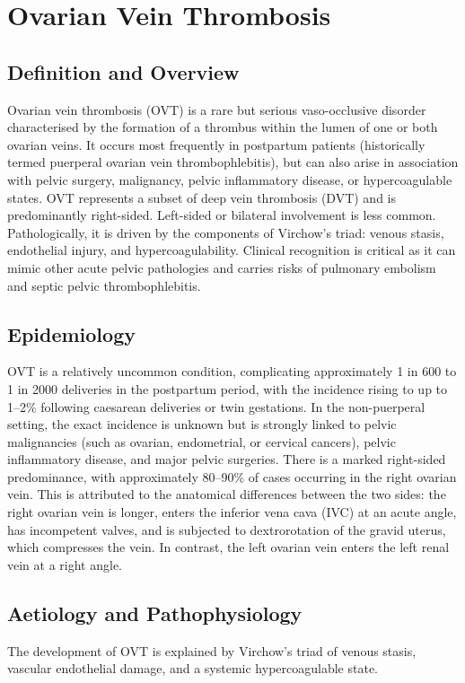 \chapter{Ovarian Vein Thrombosis}

\section*{Definition and Overview}
Ovarian vein thrombosis (OVT) is a rare but serious vaso-occlusive disorder characterised by the formation of a thrombus within the lumen of one or both ovarian veins. It occurs most frequently in postpartum patients (historically termed puerperal ovarian vein thrombophlebitis), but can also arise in association with pelvic surgery, malignancy, pelvic inflammatory disease, or hypercoagulable states. OVT represents a subset of deep vein thrombosis (DVT) and is predominantly right-sided. Left-sided or bilateral involvement is less common. Pathologically, it is driven by the components of Virchow's triad: venous stasis, endothelial injury, and hypercoagulability. Clinical recognition is critical as it can mimic other acute pelvic pathologies and carries risks of pulmonary embolism and septic pelvic thrombophlebitis.

\section*{Epidemiology}
OVT is a relatively uncommon condition, complicating approximately 1 in 600 to 1 in 2000 deliveries in the postpartum period, with the incidence rising to up to 1--2\% following caesarean deliveries or twin gestations. In the non-puerperal setting, the exact incidence is unknown but is strongly linked to pelvic malignancies (such as ovarian, endometrial, or cervical cancers), pelvic inflammatory disease, and major pelvic surgeries. There is a marked right-sided predominance, with approximately 80--90\% of cases occurring in the right ovarian vein. This is attributed to the anatomical differences between the two sides: the right ovarian vein is longer, enters the inferior vena cava (IVC) at an acute angle, has incompetent valves, and is subjected to dextrorotation of the gravid uterus, which compresses the vein. In contrast, the left ovarian vein enters the left renal vein at a right angle.

\section*{Aetiology and Pathophysiology}
The development of OVT is explained by Virchow's triad of venous stasis, vascular endothelial damage, and a systemic hypercoagulable state.

